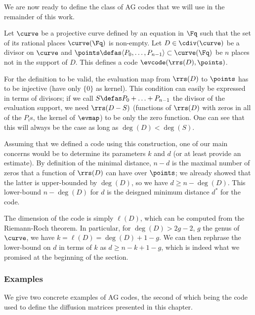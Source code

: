 We are now ready to define the class of AG codes that we will use in the remainder of this work.

Let $\curve$ be a projective curve defined by an equation in $\Fq$ such that the set of its rational places $\curve(\Fq)$ is non-empty.
Let $D \in \cdiv(\curve)$ be a divisor on $\curve$ and $\points \defas \langle P_0, \ldots, P_{n-1}\rangle \subset \curve(\Fq)$ be $n$ places not in the support of $D$.
This defines a code $\evcode(\rrs(D), \points)$.

For the definition to be valid, the evaluation map from $\rrs(D)$ to $\points$ has to be injective (\ie have only $\{0\}$ as kernel).
This condition can easily be expressed in terms of divisors; if we call $S \defas P_0 + \ldots + P_{n-1}$ the divisor of the
evaluation support, we need $\rrs(D - S)$ (\ie functions of $\rrs(D)$ with zeros in all of the $P_i$s, \ie the kernel of $\evmap$) to be only the zero function.
One can see that this will always be the case as long as $\deg(D) < \deg(S)$.

\medskip

Assuming that we defined a code using this construction, one of our main concerns would be to determine its parameters $k$ and $d$ (or at least provide an estimate).
By definition of the minimal distance, $n - d$ is the maximal number of zeros that a function of $\rrs(D)$ can have
over $\points$; we already showed that the latter is upper-bounded by $\deg(D)$, so we have $d \geq n - \deg(D)$. This lower-bound
$n - \deg(D)$ for $d$ is the deisgned minimum distance $d^*$ for the code.

The dimension of the code is simply $\ell(D)$, which can be computed from the Riemann-Roch theorem. In particular, for $\deg(D) > 2g -2$, $g$ the genus of
$\curve$, we have $k = \ell(D) = \deg(D) + 1 - g$. We can then rephrase the lower-bound on $d$ in terms of $k$ as $d \geq n - k + 1 - g$, which is indeed
what we promised at the beginning of the section.

\subsubsection{Examples}

We give two concrete examples of AG codes, the second of which being the code used to define the diffusion matrices presented in this chapter.

